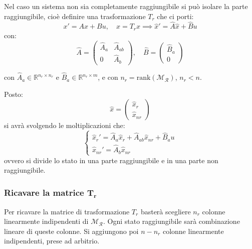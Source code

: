 \documentclass[a4paper,11pt]{article}
\begin{document}
Nel caso un sistema non sia completamente raggiungibile si può isolare la parte raggiungibile, cioè definire una trasformazione $T_r$ che ci porti:
$$
x' = Ax + Bu, \quad \hat{x} = T_r x \implies \hat{x}' = \hat{A} \hat{x} + \hat{B} u
$$
con:
$$
\hat{A} = \begin{pmatrix}
\hat{A}_a & \hat{A}_{ab} \\
0 & \hat{A}_b
\end{pmatrix}, \quad
\hat{B} = \begin{pmatrix}
	\hat{B}_a \\
	0
\end{pmatrix}
$$

con $\hat{A}_a \in \mathbb{R}^{n_r \times n_r}$ e $\hat{B}_a \in \mathbb{R}^{n_r \times m}$, e con $n_r = \mathrm{rank}(\mathcal{M}_\mathcal{R})$, $n_r < n$.

Posto:
$$
\hat{x} = \begin{pmatrix}
	\hat{x}_r \\ 
	\hat{x}_{nr}
\end{pmatrix}
$$
si avrà svolgendo le moltiplicazioni che:
\[
	\begin{cases}
		\hat{x}_r' = \hat{A}_a \hat{x}_r + \hat{A}_{ab} \hat{x}_{nr} + \hat{B}_a u\\
		\hat{x}_{nr}' = \hat{A}_b \hat{x}_{nr}
	\end{cases}
\]
ovvero si divide lo stato in una parte raggiungibile e in una parte non raggiungibile.

\subsubsection{Ricavare la matrice $\mathbf{T_r}$}
Per ricavare la matrice di trasformazione $T_r$ basterà scegliere $n_r$ colonne linearmente indipendenti di $\mathcal{M}_\mathcal{R}$.
Ogni stato raggiungibile sarà combinazione lineare di queste colonne.
Si aggiungono poi $n - n_r$ colonne linearmente indipendenti, prese ad arbitrio.
\end{document}
